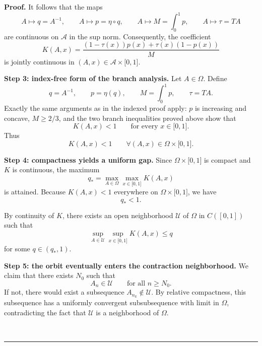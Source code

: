 \documentclass[onecolumn]{article}
\newenvironment{proof}[1][Proof]{\noindent\textbf{#1.} }{\ \rule{0.5em}{0.5em}}
\begin{document}
\begin{proof}
It follows that the maps 
\begin{equation}
A\mapsto q=A^{-1},\qquad A\mapsto p=\eta \circ q,\qquad A\mapsto
M=\int_{0}^{1}p,\qquad A\mapsto \tau =TA  \label{1692}
\end{equation}%
are continuous on $\mathcal{A}$ in the sup norm. Consequently, the
coefficient 
\begin{equation}
K(A,x)=\frac{(1-\tau (x))p(x)+\tau (x)(1-p(x))}{M}  \label{1693}
\end{equation}%
is jointly continuous in $(A,x)\in \mathcal{A}\times \lbrack 0,1]$.

\textbf{Step 3: index-free form of the branch analysis.} Let $A\in \Omega $.
Define 
\begin{equation}
q=A^{-1},\qquad p=\eta (q),\qquad M=\int_{0}^{1}p,\qquad \tau =TA.
\label{1694}
\end{equation}%
Exactly the same arguments as in the indexed proof apply: $p$ is increasing
and concave, $M\geq 2/3$, and the two branch inequalities proved above show
that 
\begin{equation}
K(A,x)<1\qquad \text{for every }x\in \lbrack 0,1].  \label{1695}
\end{equation}%
Thus 
\begin{equation}
K(A,x)<1\qquad \forall (A,x)\in \Omega \times \lbrack 0,1].  \label{1696}
\end{equation}

\textbf{Step 4: compactness yields a uniform gap.} Since $\Omega \times
\lbrack 0,1]$ is compact and $K$ is continuous, the maximum 
\begin{equation}
q_{\ast }=\max_{A\in \Omega }\max_{x\in \lbrack 0,1]}K(A,x)  \label{1697}
\end{equation}%
is attained. Because $K(A,x)<1$ everywhere on $\Omega \times \lbrack 0,1]$,
we have 
\begin{equation}
q_{\ast }<1.  \label{1698}
\end{equation}

By continuity of $K$, there exists an open neighborhood $\mathcal{U}$ of $%
\Omega $ in $C([0,1])$ such that 
\begin{equation}
\sup_{A\in \mathcal{U}}\sup_{x\in \lbrack 0,1]}K(A,x)\leq q  \label{1699}
\end{equation}%
for some $q\in (q_{\ast },1)$.

\textbf{Step 5: the orbit eventually enters the contraction neighborhood.}
We claim that there exists $N_{0}$ such that 
\begin{equation}
A_{n}\in \mathcal{U}\qquad \text{for all }n\geq N_{0}.  \label{1700}
\end{equation}%
If not, there would exist a subsequence $A_{n_{k}}\notin \mathcal{U}$. By
relative compactness, this subsequence has a uniformly convergent
subsubsequence with limit in $\Omega $, contradicting the fact that $%
\mathcal{U}$ is a neighborhood of $\Omega $.


\end{proof}
\end{document}
